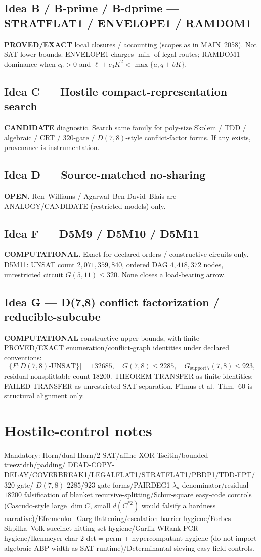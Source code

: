 \documentclass[11pt]{article}
\begin{document}
\subsection*{Idea B / B-prime / B-dprime --- STRATFLAT1 / ENVELOPE1 / RAMDOM1}
\textbf{PROVED/EXACT} local closures / accounting (scopes as in MAIN~2058).
Not SAT lower bounds. ENVELOPE1 charges $\min$ of legal routes; RAMDOM1 dominance
when $c_0\gt 0$ and $\ell+c_0K^2\lt\max\{a,q+bK\}$.

\subsection*{Idea C --- Hostile compact-representation search}
\textbf{CANDIDATE} diagnostic. Search same family for poly-size Skolem / TDD /
algebraic / CRT / $320$-gate / $D(7,8)$-style conflict-factor forms. If any exists,
provenance is instrumentation.

\subsection*{Idea D --- Source-matched no-sharing}
\textbf{OPEN.} Ren--Williams / Agarwal--Ben-David--Blais are ANALOGY/CANDIDATE
(restricted models) only.

\subsection*{Idea F --- D5M9 / D5M10 / D5M11}
\textbf{COMPUTATIONAL.} Exact for declared orders / constructive circuits only.
D5M11: UNSAT count $2{,}071{,}359{,}840$, ordered DAG $4{,}418{,}372$ nodes,
unrestricted circuit $G(5,11)\le 320$. None closes a load-bearing arrow.

\subsection*{Idea G --- D(7,8) conflict factorization / reducible-subcube}
\textbf{COMPUTATIONAL} constructive upper bounds, with finite PROVED/EXACT
enumeration/conflict-graph identities under declared conventions:
\[
|\{F:D(7,8)\text{-UNSAT}\}|=132685,\quad
G(7,8)\le 2285,\quad
G_{\mathrm{support}\,7}(7,8)\le 923,
\]
residual nonsplittable count $18200$. THEOREM TRANSFER as finite identities;
FAILED TRANSFER as unrestricted SAT separation. Filmus et al.\ Thm.~60 is
structural alignment only.

\section*{Hostile-control notes}
Mandatory: Horn/dual-Horn/2-SAT/affine-XOR-Tseitin/bounded-treewidth/padding/
DEAD-COPY-DELAY/COVERBREAK1/LEGALFLAT1/STRATFLAT1/PBDP1/TDD-FPT/$320$-gate/
$D(7,8)$ $2285$/$923$-gate forms/PAIRDEG1 $\lambda_a$ denominator/residual-$18200$
falsification of blanket recursive-splitting/Schur-square easy-code controls
(Cascudo-style large $\dim C$, small $d(C^{*2})$ would falsify a hardness
narrative)/Efremenko+Garg flattening/escalation-barrier hygiene/Forbes--Shpilka--Volk
succinct-hitting-set hygiene/Garlik WRank PCR hygiene/Ikenmeyer char-$2$
det$=$perm + hypercomputant hygiene (do not import algebraic ABP width as SAT
runtime)/Determinantal-sieving easy-field controls.
\end{document}
